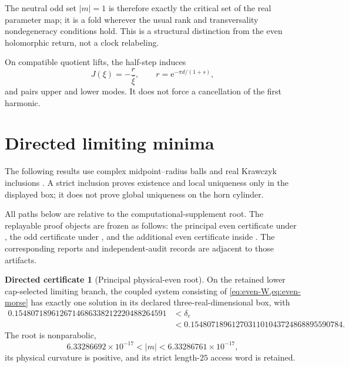 \documentclass[11pt]{article}
\theoremstyle{definition}
\newtheorem{certificate}[theorem]{Directed certificate}
\theoremstyle{remark}
\newcommand{\e}{\mathrm e}
\begin{document}
The neutral odd set $|m|=1$ is therefore exactly the critical set of the real parameter map; it is a fold wherever the usual rank and transversality nondegeneracy conditions hold.  This is a structural distinction from the even holomorphic return, not a clock relabeling.

On compatible quotient lifts, the half-step induces
\begin{equation}
  J(\xi)=-\frac{r}{\bar\xi},
  \qquad r=\e^{-\pi d/(1+s)},
  \label{eq:J}
\end{equation}
and pairs upper and lower modes.  It does not force a cancellation of the first harmonic.

\section{Directed limiting minima}

The following results use complex midpoint--radius balls and real Krawczyk inclusions \citep{Krawczyk1969,MooreKearfottCloud2009,Johansson2017Arb,Rump2010}.  A strict inclusion proves existence and local uniqueness only in the displayed box; it does not prove global uniqueness on the horn cylinder.

All paths below are relative to the computational-supplement root.  The replayable proof objects are frozen as follows: the principal even certificate under , the odd certificate under , and the additional even certificate inside .  The corresponding reports and independent-audit records are adjacent to those artifacts.

\begin{certificate}[Principal physical-even root]\label{cert:principal}
On the retained lower cap-selected limiting branch, the coupled system consisting of \cref{eq:even-W,eq:even-morse} has exactly one solution in its declared three-real-dimensional box, with
\begin{equation}
\begin{split}
0.1548071896126714686338212220488264591
&<\delta_e\\
&<0.1548071896127031101043724868895590784.
\end{split}
\label{eq:principal-interval}
\end{equation}
The root is nonparabolic,
\[
  6.33286692\times10^{-17}<|m|<6.33286761\times10^{-17},
\]
its physical curvature is positive, and its strict length-$25$ access word is retained.
\end{certificate}
\end{document}
